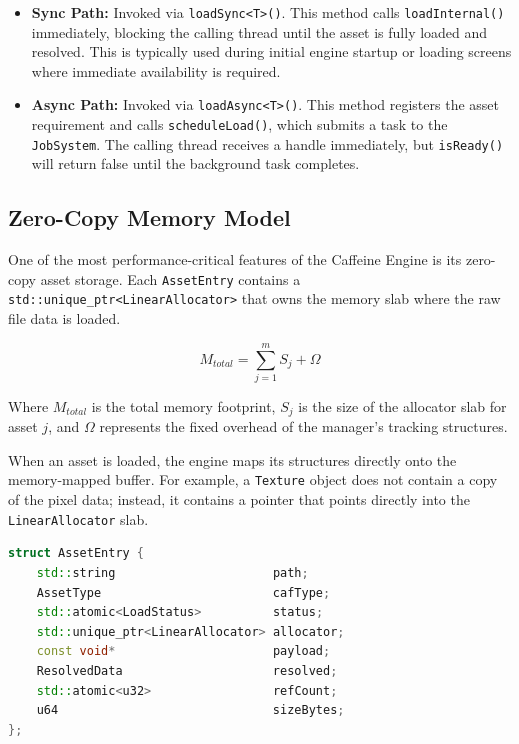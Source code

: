 \begin{itemize}
    \item \textbf{Sync Path:} Invoked via \texttt{loadSync<T>()}. This method calls \texttt{loadInternal()} immediately, blocking the calling thread until the asset is fully loaded and resolved. This is typically used during initial engine startup or loading screens where immediate availability is required.
    \item \textbf{Async Path:} Invoked via \texttt{loadAsync<T>()}. This method registers the asset requirement and calls \texttt{scheduleLoad()}, which submits a task to the \texttt{JobSystem}. The calling thread receives a handle immediately, but \texttt{isReady()} will return false until the background task completes.
\end{itemize}

\subsection{Zero-Copy Memory Model}

One of the most performance-critical features of the Caffeine Engine is its zero-copy asset storage. Each \texttt{AssetEntry} contains a \texttt{std::unique_ptr<LinearAllocator>} that owns the memory slab where the raw file data is loaded.

\begin{equation}
    M_{total} = \sum_{j=1}^{m} S_j + \Omega
\end{equation}

Where $M_{total}$ is the total memory footprint, $S_j$ is the size of the allocator slab for asset $j$, and $\Omega$ represents the fixed overhead of the manager's tracking structures.

When an asset is loaded, the engine maps its structures directly onto the memory-mapped buffer. For example, a \texttt{Texture} object does not contain a copy of the pixel data; instead, it contains a pointer that points directly into the \texttt{LinearAllocator} slab.

\begin{lstlisting}[language=C++, caption={AssetEntry Structure}]
struct AssetEntry {
    std::string                      path;
    AssetType                        cafType;
    std::atomic<LoadStatus>          status;
    std::unique_ptr<LinearAllocator> allocator;
    const void*                      payload;
    ResolvedData                     resolved;
    std::atomic<u32>                 refCount;
    u64                              sizeBytes;
};
\end{lstlisting}


